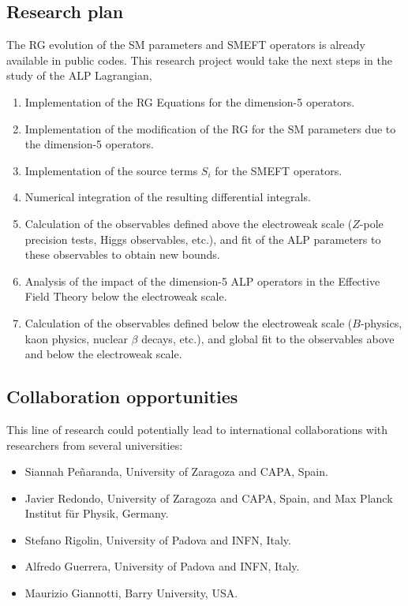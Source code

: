 \documentclass[12pt, a4paper]{article}
\begin{document}
\subsection{Research plan}
The RG evolution of the SM parameters and SMEFT operators is already available in public codes. This research project would take the next steps in the study of the ALP Lagrangian,
\begin{enumerate}
\item Implementation of the RG Equations for the dimension-5 operators.
\item Implementation of the modification of the RG for the SM parameters due to the dimension-5 operators.
\item Implementation of the source terms $S_i$ for the SMEFT operators.
\item Numerical integration of the resulting differential integrals.
\item Calculation of the observables defined above the electroweak scale ($Z$-pole precision tests, Higgs observables, etc.), and fit of the ALP parameters to these observables to obtain new bounds.
\item Analysis of the impact of the dimension-5 ALP operators in the Effective Field Theory below the electroweak scale.
\item Calculation of the observables defined below the electroweak scale ($B$-physics, kaon physics, nuclear $\beta$ decays, etc.), and global fit to the observables above and below the electroweak scale.
\end{enumerate}

\subsection{Collaboration opportunities}
This line of research could potentially lead to international collaborations with researchers from several universities: 
\begin{itemize}
\item Siannah Peñaranda, University of Zaragoza and CAPA, Spain.
\item Javier Redondo, University of Zaragoza and CAPA, Spain, and Max Planck Institut für Physik, Germany.
\item Stefano Rigolin, University of Padova and INFN, Italy.
\item Alfredo Guerrera, University of Padova and INFN, Italy.
\item Maurizio Giannotti, Barry University, USA.
\end{itemize}
\end{document}
